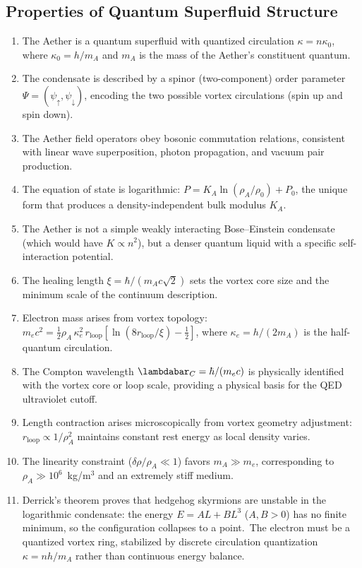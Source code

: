 ﻿\documentclass[12pt,letterpaper]{article}
\newcommand{\rhoa}{\rho_{\!A}}
\newcommand{\Ka}{K_{\!A}}
\begin{document}
\subsection{Properties of Quantum Superfluid Structure}

\begin{enumerate}[leftmargin=2em]
  \item The Aether is a quantum superfluid with quantized circulation
    $\kappa = n \kappa_0$, where $\kappa_0 = h/m_A$ and $m_A$ is the mass of
    the Aether's constituent quantum.
  \item The condensate is described by a spinor (two-component) order parameter
    $\Psi = (\psi_\uparrow, \psi_\downarrow)$, encoding the two possible
    vortex circulations (spin up and spin down).
  \item The Aether field operators obey bosonic commutation relations, consistent
    with linear wave superposition, photon propagation, and vacuum pair
    production.
  \item The equation of state is logarithmic: $P = \Ka \ln(\rhoa/\rho_0) + P_0$,
    the unique form that produces a density-independent bulk modulus $\Ka$.
  \item The Aether is not a simple weakly interacting Bose--Einstein condensate
    (which would have $K \propto n^2$), but a denser quantum liquid with a
    specific self-interaction potential.
  \item The healing length $\xi = \hbar/(m_A c \sqrt{2})$ sets the vortex core
    size and the minimum scale of the continuum description.
  \item Electron mass arises from vortex topology: $m_e c^2 = \frac{1}{2}\rhoa\,
    \kappa_e^2\,r_{\mathrm{loop}}[\ln(8r_{\mathrm{loop}}/\xi) - \frac{1}{2}]$, where $\kappa_e
    = h/(2m_A)$ is the half-quantum circulation.
  \item The Compton wavelength $\lambdabar_C = \hbar/(m_e c)$ is physically
    identified with the vortex core or loop scale, providing a physical basis
    for the QED ultraviolet cutoff.
  \item Length contraction arises microscopically from vortex geometry adjustment:
    $r_{\mathrm{loop}} \propto 1/\rhoa^2$ maintains constant rest energy as
    local density varies.
  \item The linearity constraint ($\delta\rho/\rhoa \ll 1$) favors $m_A \gg m_e$,
    corresponding to $\rhoa \gg 10^6$~kg/m$^3$ and an extremely stiff medium.
  \item Derrick's theorem proves that hedgehog skyrmions are unstable in the
    logarithmic condensate: the energy $E = AL + BL^3$ ($A, B > 0$) has no finite
    minimum, so the configuration collapses to a point.\ The electron must be a
    quantized vortex ring, stabilized by discrete circulation quantization
    $\kappa = nh/m_A$ rather than continuous energy balance.
\end{enumerate}
\end{document}

